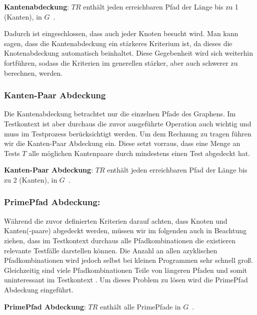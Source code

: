 \begin{definition}
    \textbf{Kantenabdeckung}: $TR$ enthält jeden erreichbaren Pfad der Länge bis zu 1 (Kanten), in $G$~\cite[vgl. Criterion 2.2]{software-testing}.
    \label{edgecov}
\end{definition}

Dadurch ist eingeschlossen, dass auch jeder Knoten besucht wird.
Man kann sagen, dass die Kantenabdeckung ein stärkeres Kriterium ist, da dieses die Knotenabdeckung automatisch beinhaltet.
Diese Gegebenheit wird sich weiterhin fortführen, sodass die Kriterien im generellen stärker, aber auch schwerer zu berechnen, werden.

\subsubsection{Kanten-Paar Abdeckung}

Die Kantenabdeckung betrachtet nur die einzelnen Pfade des Graphens.
Im Testkontext ist aber durchaus die zuvor ausgeführte Operation auch wichtig und muss im Testprozess berücksichtigt werden.
Um dem Rechnung zu tragen führen wir die Kanten-Paar Abdeckung ein.
Diese setzt vorraus, dass eine Menge an Tests $T$ alle möglichen Kantenpaare durch mindestens einen Test abgedeckt hat.

\begin{definition}
    \textbf{Kanten-Paar Abdeckung}: $TR$ enthält jeden erreichbaren Pfad der Länge bis zu 2 (Kanten), in $G$~\cite[vgl. Criterion 2.3]{software-testing}.
    \label{edgepaircov}
\end{definition}

\subsubsection{PrimePfad Abdeckung:}

Während die zuvor definierten Kriterien darauf achten, dass Knoten und Kanten(-paare) abgedeckt werden, müssen wir im folgenden auch in Beachtung
ziehen, dass im Testkontext durchaus alle Pfadkombinationen die existieren relevante Testfälle darstellen können.
Die Anzahl an allen azyklischen Pfadkombinationen wird jedoch selbst bei kleinen Programmen sehr schnell groß\cite[vgl. S. 35]{software-testing}.
Gleichzeitig sind viele Pfadkombinationen Teile von längeren Pfaden und somit uninteressant im Testkontext \cite[vgl. S. 35]{software-testing}.
Um dieses Problem zu lösen wird die PrimePfad Abdeckung eingeführt.

\begin{definition}
    \textbf{PrimePfad Abdeckung}: $TR$ enthält alle PrimePfade in $G$~\cite[vgl. Criterion 2.4]{software-testing}.
    \label{primecov}
\end{definition}

